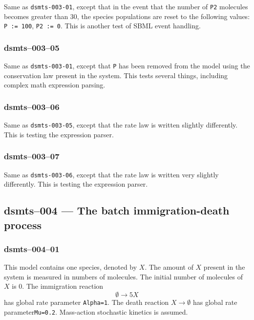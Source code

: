 Same as \verb$dsmts-003-01$, except that in the event that the number
of \verb$P2$ molecules becomes greater than 30, the species
populations are reset to the following values: \verb$P := 100$, 
\verb$P2 := 0$. This is another test of SBML event
handling.


\subsubsection{dsmts--003--05} 

Same as \verb$dsmts-003-01$, except that \verb$P$ has been removed
from the model using the conservation law present in the system. This
tests several things, including complex math expression
parsing.


\subsubsection{dsmts--003--06} 

Same as \verb$dsmts-003-05$, except that the rate law is written
slightly differently. This is testing the expression
parser.


\subsubsection{dsmts--003--07} 

Same as \verb$dsmts-003-06$, except that the rate law is written very
slightly differently. This is testing the expression
parser.



\subsection{dsmts--004 --- The batch immigration-death process}

\subsubsection{dsmts--004--01}

This model contains one species, denoted by $X$. The amount of $X$
present in the system is measured in numbers of molecules. The initial
number of molecules of $X$ is $0$. The immigration reaction
\[
\emptyset \longrightarrow 5 X
\] 
has global rate parameter
\texttt{Alpha=1}. The death reaction $X\longrightarrow \emptyset$ has
global rate parameter\texttt{Mu=0.2}. Mass-action stochastic kinetics
is assumed.


